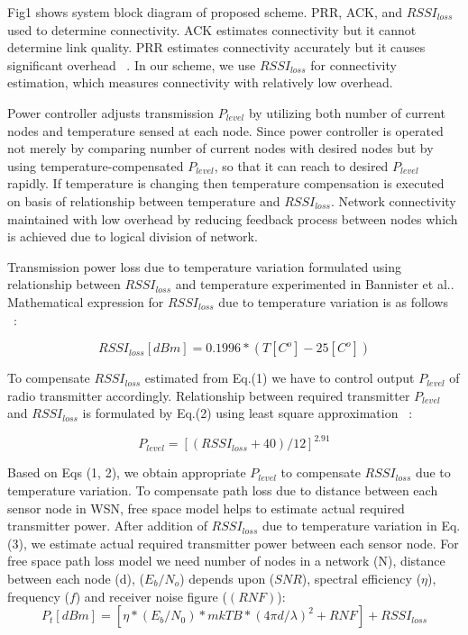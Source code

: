 \documentclass[12pt, conference, compsocconf, onecolumn, draftcls]{IEEEtran}
\begin{document}
Fig1 shows system block diagram of proposed scheme. PRR, ACK, and $RSSI_{loss}$ used to determine connectivity. ACK estimates connectivity but it cannot determine link quality. PRR estimates connectivity accurately but it causes significant overhead ~\cite{8}. In our scheme, we use $RSSI_{loss}$ for connectivity estimation, which measures connectivity with relatively low overhead.

Power controller adjusts transmission $P_{level}$ by utilizing both number of current nodes and temperature sensed at each node. Since power controller is operated not merely by comparing number of current nodes with desired nodes but by using temperature-compensated $P_{level}$, so that it can reach to desired $P_{level}$ rapidly. If temperature is changing then temperature compensation is executed on basis of relationship between temperature and $RSSI_{loss}$. Network connectivity maintained with low overhead by reducing feedback process between nodes which is achieved due to logical division of network.

Transmission power loss due to temperature variation formulated using relationship between $RSSI_{loss}$ and temperature experimented in Bannister et al.. Mathematical expression for $RSSI_{loss}$ due to temperature variation is as follows ~\cite{12}:

\begin{equation}
RSSI_{loss}[dBm]=0.1996*(T[C^{o}]-25[C^{o}])
\end{equation}

To compensate $RSSI_{loss}$ estimated from Eq.(1) we have to control output $P_{level}$ of radio transmitter accordingly. Relationship between required transmitter $P_{level}$ and $RSSI_{loss}$ is formulated by Eq.(2) using least square approximation ~\cite{12}:

\begin{equation}
P_{level}=[(RSSI_{loss}+40)/12]^{2.91}
\end{equation}

Based on Eqs (1, 2), we obtain appropriate $P_{level}$ to compensate $RSSI_{loss}$ due to temperature variation. To compensate path loss due to distance  between each sensor node in WSN, free space model helps to estimate actual required transmitter power. After addition of $RSSI_{loss}$ due to temperature variation in Eq.(3), we estimate actual required transmitter power between each sensor node. For free space path loss model  we need number of nodes in a network (N), distance between each node (d), ($E_{b}/N_{o}$) depends upon ($SNR$), spectral efficiency ($\eta$), frequency ($f$) and receiver noise figure ($(RNF)$):
 \begin{equation}
P_{t}[dBm]=[\eta*(E_{b}/N_{0})*mkTB*(4\pi d /\lambda )^2+RNF]+RSSI_{loss}
\end{equation}
\end{document}
